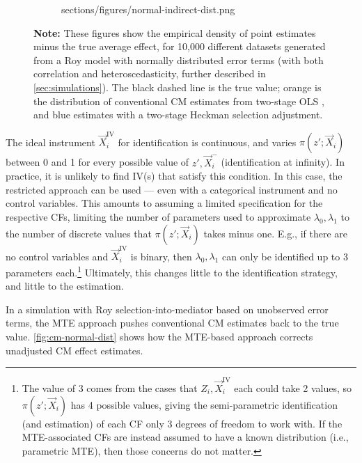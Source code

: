 \begin{figure}[!h]
\begin{subfigure}[c]{0.475\textwidth}
{            sections/figures/normal-indirect-dist.png}
    \end{subfigure}
    \label{fig:cm-normal-dist}
    \justify
    \footnotesize
    \textbf{Note:}
    These figures show the empirical density of point estimates minus the true average effect, for 10,000 different datasets generated from a Roy model with normally distributed error terms (with both correlation and heteroscedasticity, further described in \autoref{sec:simulations}).
    The black dashed line is the true value;
    orange is the distribution of conventional CM estimates from two-stage OLS \citep{imai2010identification},
    and blue estimates with a two-stage Heckman selection adjustment.
\end{figure}

The ideal instrument $\vec X_i^{\text{IV}}$ for identification is continuous, and varies $\pi(z'; \vec X_i)$ between 0 and 1 for every possible value of $z', \vec X_i^-$ (identification at infinity).
In practice, it is unlikely to find IV(s) that satisfy this condition.
In this case, the \cite{brinch2017beyond} restricted approach can be used --- even with a categorical instrument and no control variables.
This amounts to assuming a limited specification for the respective CFs, limiting the number of parameters used to approximate $\lambda_0, \lambda_1$ to the number of discrete values that $\pi(z'; \vec X_i)$ takes minus one.
E.g., if there are no control variables and $\vec X_i^{\text{IV}}$ is binary, then $\lambda_0, \lambda_1$ can only be identified up to 3 parameters each.\footnote{
    The value of 3 comes from the cases that $Z_i, \vec X_i^{\text{IV}}$ each could take 2 values, so $\pi(z'; \vec X_i)$ has 4 possible values, giving the semi-parametric identification (and estimation) of each CF only 3 degrees of freedom to work with.
    If the MTE-associated CFs are instead assumed to have a known distribution (i.e., parametric MTE), then those concerns do not matter.
}
Ultimately, this changes little to the identification strategy, and little to the estimation.

In a simulation with Roy selection-into-mediator based on unobserved error terms, the MTE approach pushes conventional CM estimates back to the true value. 
\autoref{fig:cm-normal-dist} shows how the MTE-based approach corrects unadjusted CM effect estimates.
